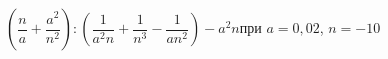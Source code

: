 \begin{ex}[type=expr_calc]
	\begin{condition}
		\( \left( \dfrac{n}{a}+\dfrac{a^2}{n^2} \right):\left( \dfrac{1}{a^2n}+\dfrac{1}{n^3}-\dfrac{1}{an^2} \right)-a^2n \)\hspace{0.5cm}при \( a=0,02 \), \( n=-10 \)
	\end{condition}
\end{ex}